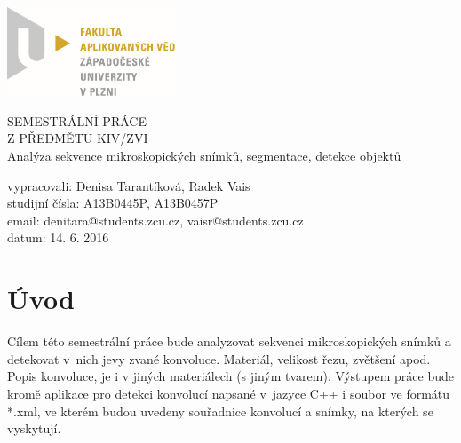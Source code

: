 \documentclass[12pt, a4paper]{report}
\begin{document}
	\begin{titlepage}
	\includegraphics[width=5cm,natwidth=601,natheight=314]{logo.png}
		
	\vspace{4cm}
		\begin {center}
		{\Huge SEMESTRÁLNÍ PRÁCE\\ Z PŘEDMĚTU KIV/ZVI\\}
		{\huge Analýza sekvence mikroskopických snímků, segmentace, detekce objektů\\}
		\end {center}
	\vspace{7cm}
			
	\noindent vypracovali: Denisa Tarantíková, Radek Vais \\
				studijní čísla: A13B0445P, A13B0457P\\
				email:	denitara@students.zcu.cz, vaisr@students.zcu.cz\\
				datum:	14. 6. 2016
	\end{titlepage}

\tableofcontents
\chapter{Úvod}
	Cílem této semestrální práce bude analyzovat sekvenci mikroskopických snímků a detekovat v~nich jevy zvané konvoluce. Materiál, velikost řezu, zvětšení apod. Popis konvoluce, je i v jiných materiálech (s jiným tvarem). Výstupem práce bude kromě aplikace pro detekci konvolucí napsané v~jazyce C++ i soubor ve formátu *.xml, ve kterém budou uvedeny souřadnice konvolucí a snímky, na kterých se vyskytují.
\end{document}
